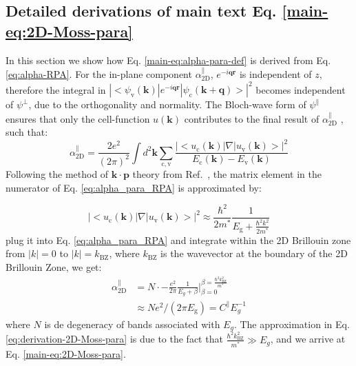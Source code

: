 \documentclass[manuscript=suppinfo,email=true,hyperref=true,keywords=false]{achemso}
\begin{document}


\subsection{Detailed derivations of main text Eq. \ref{main-eq:2D-Moss-para}}  %
\label{ssec:theory-1-para}

In this section we show how Eq. \ref{main-eq:alpha-para-def}
is derived from Eq. \ref{eq:alpha-RPA}. For the in-plane component
$\alpha_{\mathrm{2D}}^{\parallel}$, $e^{-i\mathbf{qr}}$ is independent
of $z$, therefore the integral in
$|<\psi_{\mathrm{v}}(\mathbf{k})|e^{-i\mathbf{q}\mathbf{r}}|\psi_{\mathrm{c}}(\mathbf{k+q})>|^{2}$
becomes independent of $\psi^{\perp}$, due to the orthogonality
and normality. The Bloch-wave form of $\psi^{\parallel}$ ensures that
only the cell-function $u(\mathbf{k})$ contributes to the final result
of $\alpha^{\parallel}_{\mathrm{2D}}$ \cite{davies_physics_1997}, such
that:
\begin{equation}
  \label{eq:alpha_para_RPA}
  \alpha_{\mathrm{2D}}^{\parallel} = \frac{2e^{2}}
  {(2 \pi)^{2}} \int d^{2}\mathbf{k} \sum_{\mathrm{c, v}}
  \frac{|<u_{\mathrm{c}}(\mathbf{k})|\nabla|u_{\mathrm{v}}(\mathbf{k})>|^{2}}
  {E_{\mathrm{c}}(\mathbf{k}) - E_{\mathrm{v}}(\mathbf{k})}
\end{equation}
Following the method of $\mathbf{k} \cdot \mathbf{p}$ theory from
Ref.~, the matrix element in the numerator
of Eq. \ref{eq:alpha_para_RPA} is approximated by:

\begin{equation}
\label{eq:matrix-approx}
|<u_{\mathrm{c}}(\mathbf{k})|\nabla|u_{\mathrm{v}}(\mathbf{k})>|^{2}
\approx {\displaystyle \frac{\hbar^{2}}{2 m^{*}}
  \frac{1}{E_{\mathrm{g}} + \frac{\hbar^{2} k^{2}}{2 m^{*}}}}
\end{equation}
plug it into Eq. \ref{eq:alpha_para_RPA} and integrate within the 2D Brillouin zone from $|k|=0$ to $|k|= k_{\mathrm{BZ}}$, where $k_{\mathrm{BZ}}$ is the wavevector at the boundary of the 2D Brillouin Zone, we get:
\begin{equation}
  \label{eq:derivation-2D-Moss-para}
  \begin{aligned}
\alpha_{\mathrm{2D}}^{\parallel} &= N\cdot -\frac{e^{2}}{2 \pi}
\frac{1}{E_{g} + \beta} \Biggr\vert_{\beta=0}^{\beta=\frac{\hbar^{2} k^{2}_{\mathrm{BZ}}}{m^{*}}} \\
&\approx N e^{2}/(2\pi E_{\mathrm{g}}) = C^{\parallel} E_{g}^{-1}
\end{aligned}
\end{equation}
where $N$ is de degeneracy of bands associated with $E_{g}$. The
approximation in Eq. \ref{eq:derivation-2D-Moss-para} is due to the
fact that $\frac{\hbar^{2} k^{2}_{\mathrm{BZ}}}{m^{*}} \gg E_{g}$, and
we arrive at Eq. \ref{main-eq:2D-Moss-para}.
\end{document}
